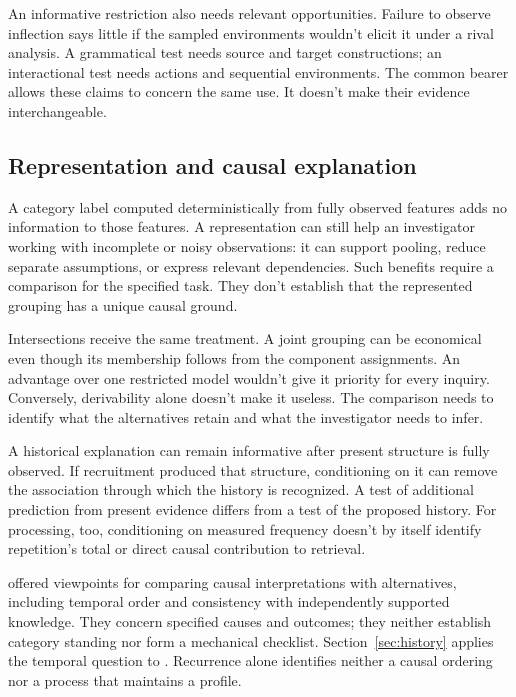 \documentclass[12pt]{article}
\begin{document}
An informative restriction also needs relevant opportunities. Failure
to observe inflection says little if the sampled environments wouldn't
elicit it under a rival analysis. A grammatical test needs source and
target constructions; an interactional test needs actions and sequential
environments. The common bearer allows these claims to concern the
same use. It doesn't make their evidence interchangeable.

\subsection{Representation and causal explanation}

A category label computed deterministically from fully observed features
adds no information to those features. A representation can still
help an investigator working with incomplete or noisy observations:
it can support pooling, reduce separate assumptions, or express relevant
dependencies. Such benefits require a comparison for the specified task.
They don't establish that the represented grouping has a unique causal
ground.

Intersections receive the same treatment. A joint grouping can be
economical even though its membership follows from the component
assignments. An advantage over one restricted model wouldn't give it
priority for every inquiry. Conversely, derivability alone doesn't make
it useless. The comparison needs to identify what the alternatives retain
and what the investigator needs to infer.

A historical explanation can remain informative after present structure
is fully observed. If recruitment produced that structure, conditioning
on it can remove the association through which the history is recognized.
A test of additional prediction from present evidence differs
from a test of the proposed history. For processing, too, conditioning
on measured frequency doesn't by itself identify repetition's total or
direct causal contribution to retrieval.

\textcite[295--299]{hill1965} offered viewpoints for comparing causal
interpretations with alternatives, including temporal order and consistency
with independently supported knowledge. They concern specified causes
and outcomes; they neither establish category standing nor form a
mechanical checklist. Section~\ref{sec:history} applies the temporal
question to . Recurrence alone identifies neither a causal
ordering nor a process that maintains a profile.
\end{document}
